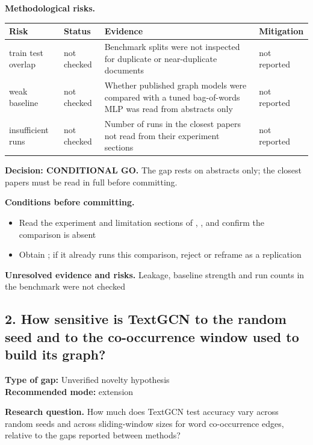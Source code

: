 \documentclass[11pt,a4paper]{article}
\begin{document}
\textbf{Methodological risks.}

{\small
\begin{longtable}{>{\raggedright\arraybackslash}p{}>{\raggedright\arraybackslash}p{}>{\raggedright\arraybackslash}p{}>{\raggedright\arraybackslash}p{}}
\toprule
\textbf{Risk} & \textbf{Status} & \textbf{Evidence} & \textbf{Mitigation} \\
\midrule
\endhead
train test overlap & not checked & Benchmark splits were not inspected for duplicate or near-duplicate documents & not reported \\
weak baseline & not checked & Whether published graph models were compared with a tuned bag-of-words MLP was read from abstracts only & not reported \\
insufficient runs & not checked & Number of runs in the closest papers not read from their experiment sections & not reported \\
\bottomrule
\end{longtable}
}

\textbf{Decision: CONDITIONAL GO.} The gap rests on abstracts only; the closest papers must be read in full before committing.

\textbf{Conditions before committing.}
\begin{itemize}
\item Read the experiment and limitation sections of \cite{galke2022}, \cite{abdalla2023}, \cite{donabauer2025} and confirm the comparison is absent
\item Obtain \cite{abdalla2023}; if it already runs this comparison, reject or reframe as a replication
\end{itemize}

\textbf{Unresolved evidence and risks.} Leakage, baseline strength and run counts in the benchmark were not checked

\subsection{2. How sensitive is TextGCN to the random seed and to the co-occurrence window used to build its graph?}
\textbf{Type of gap:} Unverified novelty hypothesis\\
\textbf{Recommended mode:} extension

\textbf{Research question.} How much does TextGCN test accuracy vary across random seeds and across sliding-window sizes for word co-occurrence edges, relative to the gaps reported between methods?
\end{document}

